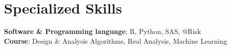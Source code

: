 \documentclass[letterpaper,11pt]{article}
\begin{document}
\section{Specialized Skills}
\begin{itemize}[leftmargin=0.15in, label={}]
    \normalsize{\item{
     \textbf{Software \& Programming language}{: R, Python, SAS, @Risk} \\
     \textbf{Course}{: Design \& Analysis Algorithms, Real Analysis, Machine Learning}\\
    }}
 \end{itemize}
\end{document}
